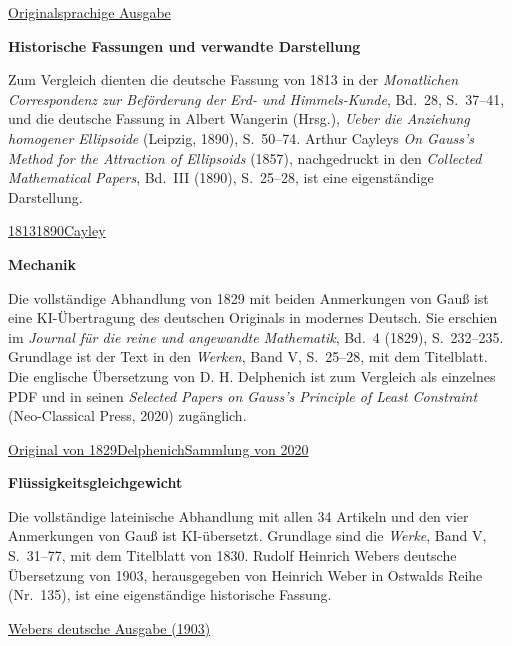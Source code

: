 \par\medskip
\noindent \href{https://github.com/KokunoYumeto/gauss-collected-works/releases/tag/gauss-original-language-2026-10-24}{Originalsprachige Ausgabe}
\par\medskip
\noindent\textbf{Historische Fassungen und verwandte Darstellung}\par\smallskip
\noindent Zum Vergleich dienten die deutsche Fassung von 1813 in der \textit{Monatlichen Correspondenz zur Beförderung der Erd- und Himmels-Kunde}, Bd.~28, S.~37--41, und die deutsche Fassung in Albert Wangerin (Hrsg.), \textit{Ueber die Anziehung homogener Ellipsoide} (Leipzig, 1890), S.~50--74. Arthur Cayleys \textit{On Gauss’s Method for the Attraction of Ellipsoids} (1857), nachgedruckt in den \textit{Collected Mathematical Papers}, Bd.~III (1890), S.~25--28, ist eine eigenständige Darstellung.
\par\medskip
\noindent \href{https://www.digitale-sammlungen.de/de/view/bsb10538617?page=43}{1813}\quad\href{https://archive.org/details/ueberdieanziehu00wanggoog}{1890}\quad\href{https://rcin.org.pl/dlibra/publication/184416/edition/170906/on-gauss-method-for-the-attraction-of-ellipsoids-cayley-arthur-1821-1895?language=en}{Cayley}
\par\medskip
\noindent\textbf{Mechanik}\par\smallskip
\noindent Die vollständige Abhandlung von 1829 mit beiden Anmerkungen von Gauß ist eine KI-Übertragung des deutschen Originals in modernes Deutsch. Sie erschien im \textit{Journal für die reine und angewandte Mathematik}, Bd.~4 (1829), S.~232--235. Grundlage ist der Text in den \textit{Werken}, Band V, S.~25--28, mit dem Titelblatt. Die englische Übersetzung von D. H. Delphenich ist zum Vergleich als einzelnes PDF und in seinen \textit{Selected Papers on Gauss’s Principle of Least Constraint} (Neo-Classical Press, 2020) zugänglich.
\par\nobreak\medskip
\noindent \href{https://doi.org/10.1515/crll.1829.4.232}{Original von 1829}\quad\href{https://www.neo-classical-physics.info/uploads/3/4/3/6/34363841/gauss_-_princ_least_constraint.pdf}{Delphenich}\quad\href{https://www.neo-classical-physics.info/uploads/3/4/3/6/34363841/selecta_on_least_constraint.pdf#page=95}{Sammlung von 2020}
\par\medskip
{}
\noindent\textbf{Flüssigkeitsgleichgewicht}\par\smallskip
\noindent Die vollständige lateinische Abhandlung mit allen 34 Artikeln und den vier Anmerkungen von Gauß ist KI-übersetzt. Grundlage sind die \textit{Werke}, Band V, S.~31--77, mit dem Titelblatt von 1830. Rudolf Heinrich Webers deutsche Übersetzung von 1903, herausgegeben von Heinrich Weber in Ostwalds Reihe (Nr.~135), ist eine eigenständige historische Fassung.
\par\smallskip
\noindent \href{https://archive.org/details/allgemeinegrund00gausgoog}{Webers deutsche Ausgabe (1903)}
\par\endgroup
\clearpage
